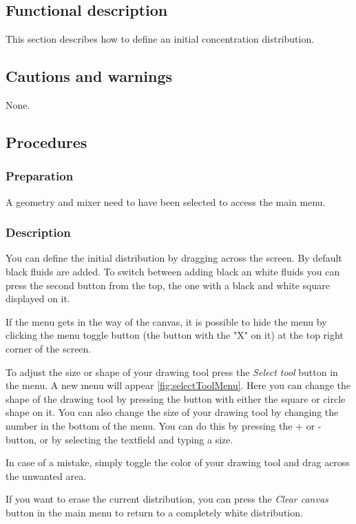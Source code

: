 \subsection{Functional description}
This section describes how to define an initial concentration distribution.

\subsection{Cautions and warnings}
None.

\subsection{Procedures}
\subsubsection{Preparation}
A geometry and mixer need to have been selected to access the main menu.

\subsubsection{Description}
You can define the initial distribution by dragging across the screen. By default black fluids are added. To switch between adding black an white fluids you can press the second button from the top, the one with a black and white square displayed on it.

If the menu gets in the way of the canvas, it is possible to hide the menu by clicking the menu toggle button (the button with the "X" on it) at the top right corner of the screen.

 To adjust the size or shape of your drawing tool press the \emph{Select tool} button in the menu. A new menu will appear \ref{fig:selectToolMenu}. Here you can change the shape of the drawing tool by pressing the button with either the square or circle shape on it. You can also change the size of your drawing tool by changing the number in the bottom of the menu. You can do this by pressing the + or - button, or by selecting the textfield and typing a size.


In case of a mistake, simply toggle the color of your drawing tool and drag across the unwanted area.

If you want to erase the current distribution, you can press the \emph{Clear canvas} button in the main menu to return to a completely white distribution.

